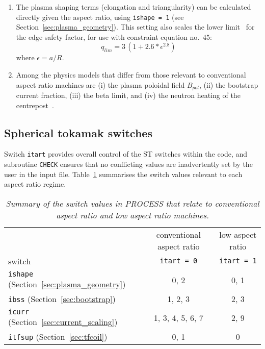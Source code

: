 \documentclass[11pt,a4paper]{report}
\newcommand{\process}{\mbox{\texttt{PROCESS}}}
\begin{document}
\begin{enumerate}
\item The plasma shaping terms (elongation and triangularity) can be
  calculated directly given the aspect ratio, using \texttt{ishape = 1} (see
  Section~\ref{sec:plasma_geometry}). This setting also scales the lower
  limit~\cite{storac} for the edge safety factor, for use with constraint
  equation no.\ 45:
  \begin{equation}
    q_{lim} = 3 \, (1 + 2.6*\epsilon^{2.8})
  \end{equation}
  where $\epsilon = a/R$. 

\item Among the physics models that differ from those relevant to conventional
  aspect ratio machines are (i) the plasma poloidal field $B_{pol}$, (ii) the
  bootstrap current fraction, (iii) the beta limit, and (iv) the neutron
  heating of the centrepost~\cite{storac}.

\end{enumerate}

\subsection{Spherical tokamak switches}

Switch \texttt{itart} provides overall control of the ST switches within the
code, and subroutine \texttt{CHECK} ensures that no conflicting values are
inadvertently set by the user in the input file. Table~\ref{tab:tart}
summarises the switch values relevant to each aspect ratio regime.

\begin{table}[tbph]
\begin{center}
  \begin{tabular}{||l|c|c||} \hline
    & conventional aspect ratio & low aspect ratio \\
    switch & \texttt{itart = 0} & \texttt{itart = 1} \\ \hline
    \texttt{ishape} (Section~\ref{sec:plasma_geometry}) & 0, 2 & 0, 1 \\
    \texttt{ibss} (Section~\ref{sec:bootstrap}) & 1, 2, 3 & 2, 3 \\
    \texttt{icurr} (Section~\ref{sec:current_scaling}) & 1, 3, 4, 5, 6, 7 & 2, 9 \\
    \texttt{itfsup} (Section~\ref{sec:tfcoil}) & 0, 1 & 0 \\
    \hline
\end{tabular}
\end{center}
\caption[\process\ switches for spherical tokamaks]
{\label{tab:tart}
  \textit{Summary of the switch values in PROCESS that relate to
    conventional aspect ratio and low aspect ratio machines.}
}
\end{table}
\end{document}
